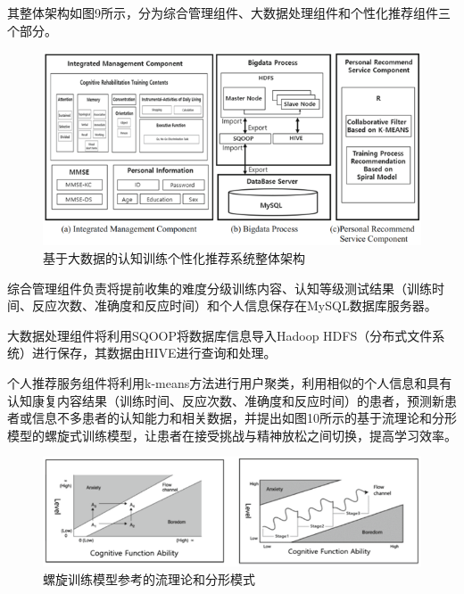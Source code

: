 \documentclass[12pt]{article}
\begin{document}
            其整体架构如图9所示，分为综合管理组件、大数据处理组件和个性化推荐组件三个部分。
            \begin{figure}[H]
            	
            	\centering
            	\includegraphics[scale=0.8]{images/Overall_architecture.png}
            	\caption{基于大数据的认知训练个性化推荐系统整体架构}
            	\label{fig:label}
            \end{figure}

            综合管理组件负责将提前收集的难度分级训练内容、认知等级测试结果（训练时间、反应次数、准确度和反应时间）和个人信息保存在MySQL数据库服务器。
 
            大数据处理组件将利用SQOOP将数据库信息导入Hadoop HDFS（分布式文件系统）进行保存，其数据由HIVE进行查询和处理。

            个人推荐服务组件将利用k-means方法进行用户聚类，利用相似的个人信息和具有认知康复内容结果（训练时间、反应次数、准确度和反应时间）的患者，预测新患者或信息不多患者的认知能力和相关数据，并提出如图10所示的基于流理论和分形模型的螺旋式训练模型，让患者在接受挑战与精神放松之间切换，提高学习效率。
            \begin{figure}[H]
            	
            	\centering
            	\includegraphics[scale=0.7]{images/flow_theory.png}
            	\caption{螺旋训练模型参考的流理论和分形模式}
            	\label{fig:label}
            \end{figure}
            
\end{document}
